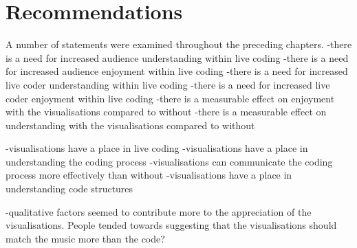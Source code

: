 \section{Recommendations}

A number of statements were examined throughout the preceding chapters.
-there is a need for increased audience understanding within live coding
-there is a need for increased audience enjoyment within live coding
-there is a need for increased live coder understanding within live coding
-there is a need for increased live coder enjoyment within live coding
-there is a measurable effect on enjoyment with the visualisations compared to without
-there is a measurable effect on understanding with the visualisations compared to without

-visualisations have a place in live coding
-visualisations have a place in understanding the coding process
-visualisations can communicate the coding process more effectively than without
-visualisations have a place in understanding code structures

-qualitative factors seemed to contribute more to the appreciation of the visualisations. People tended towards suggesting that the visualisations should match the music more than the code?


